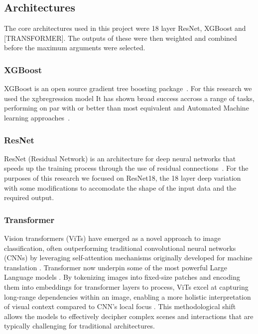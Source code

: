 
\subsection{Architectures}

The core architectures used in this project were 18 layer ResNet, XGBoost and [TRANSFORMER]. The outputs of these were
then weighted and combined before the maximum arguments were selected.




\subsubsection{XGBoost}
XGBoost is an open source gradient tree boosting package~\cite{xgboost}.
For this research we used the xgbregression model It has shown broad success accross a range of tasks, performing on par with or better than most equivalent and Automated Machine learning approaches~\cite{xgbcomp}.
\subsubsection{ResNet}
ResNet (Residual Network) is an architecture for deep neural networks that speeds up the training process through the use of residual connections~\cite{resnet}.
For the purposes of this research we focused on ResNet18, the 18 layer deep variation with some modifications to accomodate the shape of the input data and the required output.
\subsubsection{Transformer}
Vision transformers (ViTs) have emerged as a novel approach to image classification, often outperforming traditional convolutional neural networks (CNNs) by leveraging self-attention mechanisms originally developed for machine translation \cite{vaswani2017attention}. Transformer now underpin some of the most powerful Large Language models \cite{brown2020language}. By tokenizing images into fixed-size patches and encoding them into embeddings for transformer layers to process, ViTs excel at capturing long-range dependencies within an image, enabling a more holistic interpretation of visual context compared to CNN's local focus \cite{dosovitskiy2021image}. This methodological shift allows the models to effectively decipher complex scenes and interactions that are typically challenging for traditional architectures.

